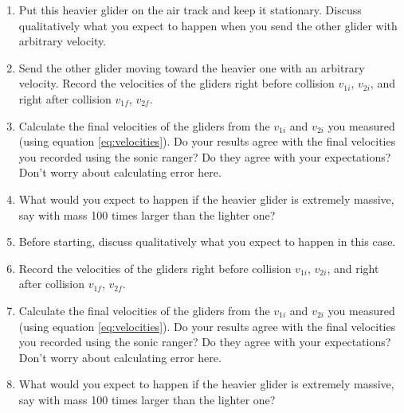 \begin{enumerate}
  \item Put this heavier glider on the air track and keep it stationary. Discuss qualitatively what you expect to happen when you send the other glider with arbitrary velocity.
  \item  Send the other glider moving toward the heavier one with an arbitrary velocity. Record the velocities of the gliders right before collision $v_{1i}$, $v_{2i}$, and right after collision $v_{1f}$, $v_{2f}$.
  \item Calculate the final velocities of the gliders from the $v_{1i}$ and $v_{2i}$ you measured (using equation \ref{eq:velocities}). Do your results agree with the final velocities you recorded using the sonic ranger? Do they agree with your expectations? Don't worry about calculating error here.
  \item What would you expect to happen if the heavier glider is extremely massive, say with mass 100 times larger than the lighter one?

  \item Before starting, discuss qualitatively what you expect to happen in this case.
  \item Record the velocities of the gliders right before collision $v_{1i}$, $v_{2i}$, and right after collision $v_{1f}$, $v_{2f}$.
  \item Calculate the final velocities of the gliders from the $v_{1i}$ and $v_{2i}$ you measured (using equation \ref{eq:velocities}). Do your results agree with the final velocities you recorded using the sonic ranger? Do they agree with your expectations? Don't worry about calculating error here.
  \item What would you expect to happen if the heavier glider is extremely massive, say with mass 100 times larger than the lighter one?

\end{enumerate}

